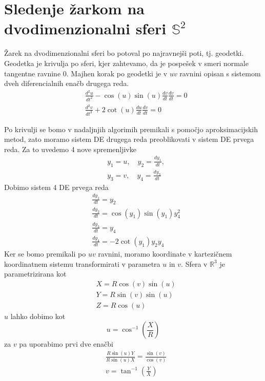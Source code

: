 \documentclass[titlepage]{article}
\begin{document}
\section{\texorpdfstring{Sledenje žarkom na dvodimenzionalni sferi \( \mathbb{S}^2 \)}{Sledenje žarkom na dvodimenzionalni sferi}}
Žarek na dvodimenzionalni sferi bo potoval po najravnejši poti, tj. geodetki. Geodetka je krivulja po sferi, kjer zahtevamo, da je
pospešek v smeri normale tangentne ravnine 0. Majhen korak po geodetki je v \( uv \) ravnini opisan s sistemom dveh diferencialnih enačb drugega reda.
\begin{equation}
    \begin{split}
        &\frac{d^{2}u}{dt^{2}}-\cos(u)\sin(u)\frac{dv}{dt}\frac{dv}{dt}=0 \\
        &\frac{d^{2}v}{dt^{2}}+2\cot(u)\frac{du}{dt}\frac{dv}{dt}=0
    \end{split}
\end{equation}

Po krivulji se bomo v nadaljnjih algorimih premikali s pomočjo aproksimacijskih metod, zato moramo sistem DE drugega reda preoblikovati v
sistem DE prvega reda. Za to uvedemo 4 nove spremenljivke
\begin{equation}
\begin{split}
    &y_{1}=u, \quad y_{2}=\frac{dy_{1}}{dt}, \\
    &y_{3}=v, \quad y_{4}=\frac{dy_{3}}{dt}
\end{split}
\end{equation}
Dobimo sistem 4 DE prvega reda
\begin{equation} \label{e:geoSys}
\begin{split}
    &\frac{dy_{1}}{dt}=y_{2} \\
    &\frac{dy_{2}}{dt}=\cos(y_{1})\sin(y_{1})y^{2}_{4} \\
    &\frac{dy_{3}}{dt}=y_{4} \\
    &\frac{dy_{4}}{dt}=-2\cot(y_{1})y_{2}y_{4}
\end{split}
\end{equation}
Ker se bomo premikali po \( uv \) ravnini, moramo koordinate v kartezičnem koordinatnem sistemu transformirati v parametra \( u \) in \( v \). Sfera v \(\mathbb{R}^3\) je
parametrizirana kot
\begin{equation} \label{e:toXYZ}
    \begin{split}
        &X=R\cos(v)\sin(u) \\
        &Y=R\sin(v)\sin(u) \\
        &Z=R\cos(u)
    \end{split}
\end{equation}
\( u \) lahko dobimo kot
\begin{equation}
        u=\cos^{-1} \left( \frac{X}{R} \right)
\end{equation}
za \( v \) pa uporabimo prvi dve enačbi
\begin{equation} \label{e:toU}
    \begin{split}
        &\frac{R\sin(u)Y}{R\sin(u)X}=\frac{\sin(v)}{\cos(v)} \\
        &v=\tan^{-1} \left(\frac{Y}{X} \right)
    \end{split}
\end{equation}
\end{document}
